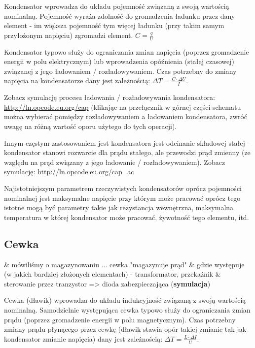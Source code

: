 Kondensator wprowadza do układu pojemność związaną z swoją wartością nominalną.
Pojemność wyraża zdolność do gromadzenia ładunku przez dany element - im większa pojemność tym więcej ładunku (przy takim samym przyłożonym napięciu) zgromadzi element. $C = \frac{q}{U}$

Kondensator typowo służy do ograniczania zmian napięcia (poprzez gromadzenie energii w polu elektrycznym) lub wprowadzenia opóźnienia (stałej czasowej) związanej z jego ładowaniem / rozładowywaniem.
Czas potrzebny do zmiany napięcia na kondensatorze dany jest zależnością: $\Delta T = \frac{C \cdot \Delta U}{I}$.

Zobacz symulację procesu ładowania / rozładowywania kondensatora: \url{http://ln.opcode.eu.org/cap}
(klikając na przełącznik w górnej części schematu  można wybierać pomiędzy rozładowywaniem a ładowaniem kondensatora, zwróć uwagę na różną wartość oporu użytego do tych operacji).

Innym częstym zastosowaniem jest kondensatora jest odcinanie składowej stałej – kondensator stanowi rozwarcie dla prądu stałego, ale przewodzi prąd zmienny (ze względu na prąd związany z jego ładowanie / rozładowywaniem).
Zobacz symulację: \url{http://ln.opcode.eu.org/cap_ac}

Najistotniejszym parametrem rzeczywistych kondensatorów oprócz pojemności nominalnej jest maksymalne napięcie przy którym może pracować oprócz tego istotne mogą być parametry takie jak rezystancja wewnętrzna, maksymalna temperatura w której kondensator może pracować, żywotność tego elementu, itd.

\subsection{Cewka}
\begin{teacherOnly}
	\begin{easylist}[itemize]
		& mówiliśmy o magazynowaniu ... cewka "magazynuje prąd"
		& gdzie występuje (w jakich bardziej złożonych elementach) - transformator, przekaźnik
		& sterowanie przez tranzystor => dioda zabezpieczająca (\textbf{symulacja})
	\end{easylist}
\end{teacherOnly}

Cewka (dławik) wprowadza do układu indukcyjność związaną z swoją wartością nominalną. Samodzielnie występująca cewka typowo służy do ograniczania zmian prądu (poprzez gromadzenie energii w polu magnetycznym). Czas potrzebny zmiany prądu płynącego przez cewkę (dławik stawia opór takiej zmianie tak jak kondensator zmianie napięcia) dany jest zależnością: $\Delta T = \frac{L \cdot \Delta I}{U}$.

